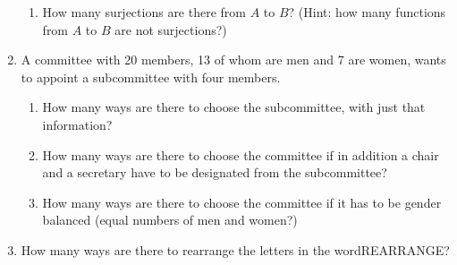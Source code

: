 \documentclass[12pt]{article}
\begin{document}
\begin{enumerate}
\begin{enumerate}
\item  How many surjections are there from $A$ to $B$?  (Hint:  how many functions from $A$ to $B$ are not surjections?)

\end{enumerate}

\item  A committee with 20 members, 13 of whom are men and 7 are women, wants to appoint a subcommittee with four members.

\begin{enumerate}

\item  How many ways are there to choose the subcommittee, with just that information?

\item  How many ways are there to choose the committee if in addition a chair and a secretary have to be designated from the subcommittee?

\item  How many ways are there to choose the committee if it has to be gender balanced (equal numbers of men and women?)

\end{enumerate}

\item  How many ways are there to rearrange the letters in the word\newline  REARRANGE?

\end{enumerate}
\end{document}
